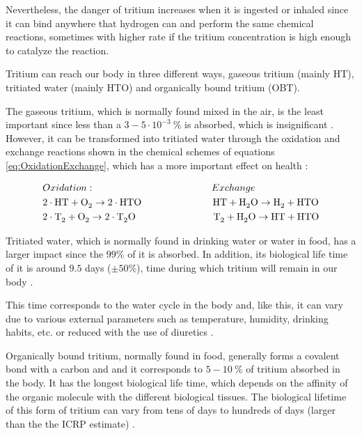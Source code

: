 Nevertheless, the danger of tritium increases when it is ingested or inhaled since it can bind anywhere that hydrogen can and perform the same chemical reactions, sometimes with higher rate if the tritium concentration is high enough to catalyze the reaction. 

Tritium can reach our body in three different ways, gaseous tritium (mainly HT), tritiated water (mainly HTO) and organically bound tritium (OBT).

The gaseous tritium, which is normally found mixed in the air, is the least important since less than a $3-5 \cdot{} 10^{-3}~\%$ is absorbed, which is insignificant \cite{TritiumHandling}. However, it can be transformed into tritiated water through the oxidation and exchange reactions shown in the chemical schemes of equations \ref{eq:OxidationExchange}, which has a more important effect on health \cite{TritiumHandling}:

\begin{equation}
\begin{split}
& Oxidation: \qquad \qquad \qquad \qquad \qquad \qquad Exchange\\
& 2\cdot{}\ce{HT} + \ce{O_2} \rightarrow 2 \cdot{} \ce{HTO} ~ \quad \qquad \qquad \qquad \ce{HT} + \ce{H_2 O} \rightarrow \ce{H_2} + \ce{HTO}\\
& 2\cdot{}\ce{T_2} + \ce{O_2} \rightarrow 2 \cdot{} \ce{T_2 O} \qquad \qquad \qquad \qquad \ce{T_2} + \ce{H_2 O} \rightarrow \ce{HT} + \ce{HTO}
\label{eq:OxidationExchange}
\end{split}
\end{equation}

Tritiated water, which is normally found in drinking water or water in food, has a larger impact since the $99\%$ of it is absorbed. In addition, its biological life time of it is around $9.5$ days ($\pm50\%$), time during which tritium will remain in our body \cite{TritiumHandling, FranceTritiumEnvironment, EstimationTritiumDosi}.

This time corresponds to the water cycle in the body and, like this, it can vary due to various external parameters such as temperature, humidity, drinking habits, etc. or reduced with the use of diuretics \cite{TritiumHandling}.

Organically bound tritium, normally found in food, generally forms a covalent bond with a carbon and and it corresponds to $5-10~\%$ of tritium absorbed in the body. It has the longest biological life time, which depends on the affinity of the organic molecule with the different biological tissues. The biological lifetime of this form of tritium can vary from tens of days to hundreds of days (larger than the the ICRP estimate) \cite{FranceTritiumEnvironment, EstimationTritiumDosi}.

